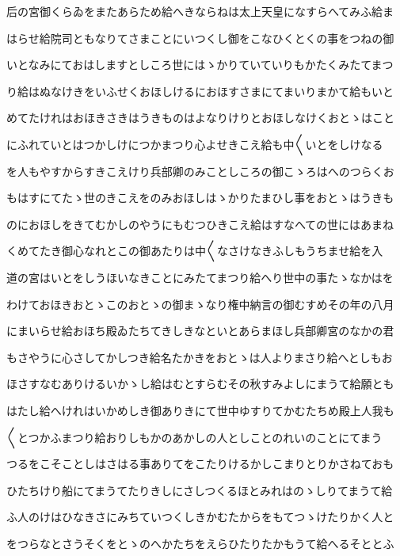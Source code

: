 \documentclass[a4paper,11pt,landscape]{ltjtarticle}
\begin{document}
\par\medskip
后の宮御くらゐをまたあらため給へきならねは太上天皇になすらへてみふ給ま
\par\medskip
はらせ給院司ともなりてさまことにいつくし御をこなひくとくの事をつねの御
\par\medskip
いとなみにておはしますとしころ世にはゝかりていていりもかたくみたてまつ
\par\medskip
り給はぬなけきをいふせくおほしけるにおほすさまにてまいりまかて給もいと
\par\medskip
めてたけれはおほきさきはうきものはよなりけりとおほしなけくおとゝはこと
\par\medskip
にふれていとはつかしけにつかまつり心よせきこえ給も中〱いとをしけなる
\par\medskip
を人もやすからすきこえけり兵部卿のみことしころの御こゝろはへのつらくお
\par\medskip
もはすにてたゝ世のきこえをのみおほしはゝかりたまひし事をおとゝはうきも
\par\medskip
のにおほしをきてむかしのやうにもむつひきこえ給はすなへての世にはあまね
\par\medskip
くめてたき御心なれとこの御あたりは中〱なさけなきふしもうちませ給を入
\par\medskip
道の宮はいとをしうほいなきことにみたてまつり給へり世中の事たゝなかはを
\par\medskip
わけておほきおとゝこのおとゝの御まゝなり権中納言の御むすめその年の八月
\par\medskip
にまいらせ給おほち殿ゐたちてきしきなといとあらまほし兵部卿宮のなかの君
\par\medskip
もさやうに心さしてかしつき給名たかきをおとゝは人よりまさり給へとしもお
\par\medskip
ほさすなむありけるいかゝし給はむとすらむその秋すみよしにまうて給願とも
\par\medskip
はたし給へけれはいかめしき御ありきにて世中ゆすりてかむたちめ殿上人我も
\par\medskip
〱とつかふまつり給おりしもかのあかしの人としことのれいのことにてまう
\par\medskip
つるをこそことしはさはる事ありてをこたりけるかしこまりとりかさねておも
\par\medskip
ひたちけり船にてまうてたりきしにさしつくるほとみれはのゝしりてまうて給
\par\medskip
ふ人のけはひなきさにみちていつくしきかむたからをもてつゝけたりかく人と
\par\medskip
をつらなとさうそくをとゝのへかたちをえらひたりたかもうて給へるそととふ
\par\medskip
\end{document}
